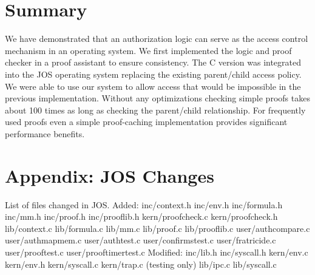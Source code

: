 \documentclass[10pt]{article}
\begin{document}
\section{Summary}
We have demonstrated that an authorization logic can serve as the access control mechanism in an operating system. We first implemented the logic and proof checker in a proof assistant to ensure consistency.  The C version was integrated into the JOS operating system replacing the existing parent/child access policy.  We were able to use our system to allow access that would be impossible in the previous implementation.  Without any optimizations checking simple proofs takes about 100 times as long as checking the parent/child relationship.  For frequently used proofs even a simple proof-caching implementation provides significant performance benefits.  

\section{Appendix: JOS Changes}
List of files changed in JOS. \newline
\newline
Added:\newline
inc/context.h \newline
inc/env.h \newline
inc/formula.h \newline
inc/mm.h \newline
inc/proof.h \newline
inc/prooflib.h \newline
kern/proofcheck.c \newline
kern/proofcheck.h \newline
lib/context.c \newline
lib/formula.c \newline
lib/mm.c \newline
lib/proof.c \newline
lib/prooflib.c \newline
user/authcompare.c \newline
user/authmapmem.c \newline
user/authtest.c \newline
user/confirmstest.c \newline
user/fratricide.c \newline
user/prooftest.c \newline
user/prooftimertest.c \newline
\newline
Modified: \newline
inc/lib.h \newline
inc/syscall.h \newline
kern/env.c \newline
kern/env.h \newline
kern/syscall.c \newline
kern/trap.c (testing only) \newline
lib/ipc.c \newline
lib/syscall.c \newline



\end{document}
